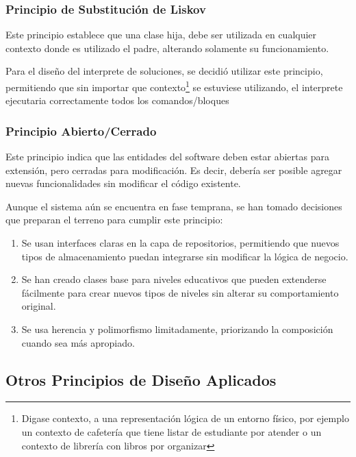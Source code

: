 \subsubsection{Principio de Substitución de Liskov}

Este principio establece que una clase hija, debe ser utilizada en cualquier contexto donde es utilizado el padre, alterando solamente su funcionamiento.

Para el diseño del interprete de soluciones, se decidió utilizar este principio, permitiendo que sin importar que contexto\footnote{Digase contexto, a una representación lógica de un entorno físico, por ejemplo un contexto de cafetería que tiene listar de estudiante por atender o un contexto de librería con libros por organizar} se estuviese utilizando, el interprete ejecutaria correctamente todos los comandos/bloques

\subsubsection{Principio Abierto/Cerrado}

Este principio indica que las entidades del software deben estar abiertas para extensión, pero cerradas para modificación. Es decir, debería ser posible agregar nuevas funcionalidades sin modificar el código existente.

Aunque el sistema aún se encuentra en fase temprana, se han tomado decisiones que preparan el terreno para cumplir este principio:

\begin{enumerate}
	\item Se usan interfaces claras en la capa de repositorios, permitiendo que nuevos tipos de almacenamiento puedan integrarse sin modificar la lógica de negocio.
	
	\item Se han creado clases base para niveles educativos que pueden extenderse fácilmente para crear nuevos tipos de niveles sin alterar su comportamiento original.
	
	\item Se usa herencia y polimorfismo limitadamente, priorizando la composición cuando sea más apropiado.
\end{enumerate}

\subsection{Otros Principios de Diseño Aplicados}

